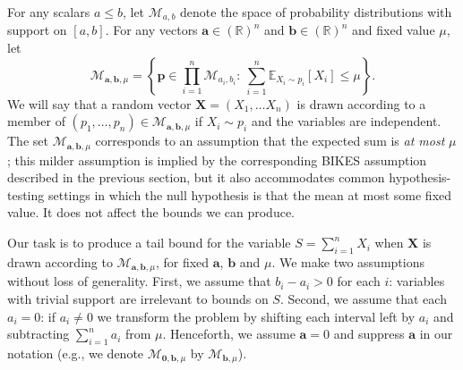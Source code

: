 \documentclass[12pt]{article}
\theoremstyle{plain}
\begin{document}
For any scalars $a \leq b$, let $\mathcal{M}_{a,b}$ denote the space of probability distributions with support on $[a,b]$.  For any vectors $\boldsymbol{a}\in ({\mathbb{R}})^n$ and $\boldsymbol{b}\in ({\mathbb{R}})^n$ and fixed value $\mu$, let
\begin{equation} \label{eq:mdef}
\mathcal{M}_{\boldsymbol{a},\boldsymbol{b},\mu} = \left\{\boldsymbol{p} \in \prod_{i=1}^n  \mathcal{M}_{a_i,b_i}:\ \sum_{i=1}^n \mathbb{E}_{X_i \sim p_i}[X_i] \leq \mu\right\}.
\end{equation}
We will say that a random vector $\boldsymbol{X}=(X_1,\ldots X_n)$ is drawn according to a member of $(p_1,\ldots,p_n)\in \mathcal{M}_{\boldsymbol{a},\boldsymbol{b},\mu}$ if $X_i \sim p_i$ and the variables are independent.  The set $\mathcal{M}_{\boldsymbol{a},\boldsymbol{b},\mu}$ corresponds to an assumption that the expected sum is \emph{at most} $\mu$; this milder assumption is implied by the corresponding BIKES assumption described in the previous section, but it also accommodates common hypothesis-testing settings in which the null hypothesis is that the mean at most some fixed value.  It does not affect the bounds we can produce.

Our task is to produce a tail bound for the variable $S=\sum_{i=1}^n X_i$ when $\boldsymbol{X}$ is drawn according to $\mathcal{M}_{\boldsymbol{a},\boldsymbol{b},\mu}$, for fixed $\boldsymbol{a}$, $\boldsymbol{b}$ and $\mu$.  We make two assumptions without loss of generality.  First, we assume that $b_i-a_i>0$ for each $i$: variables with trivial support are irrelevant to bounds on $S$.  Second, we assume that each $a_i=0$: if $a_i\neq 0$ we transform the problem by shifting each interval left by $a_i$ and subtracting $\sum_{i=1}^n a_i$ from $\mu$.  Henceforth, we assume $\boldsymbol{a}=0$ and suppress $\boldsymbol{a}$ in our notation (e.g., we denote $\mathcal{M}_{\boldsymbol{0},\boldsymbol{b},\mu}$ by $\mathcal{M}_{\boldsymbol{b},\mu}$).
\end{document}
